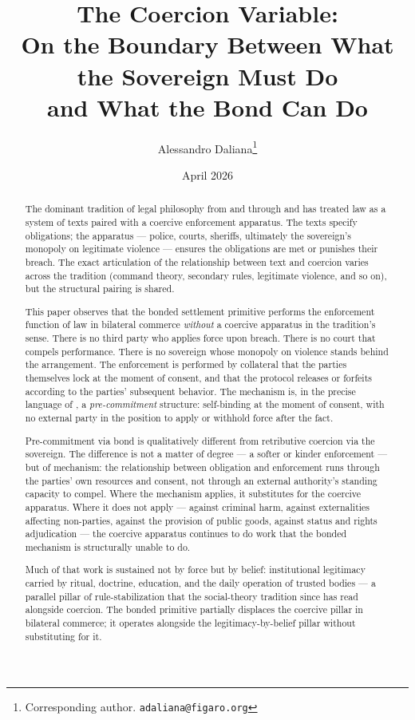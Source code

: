 \documentclass[11pt,a4paper]{article}
\title{%
  The Coercion Variable:\\
  On the Boundary Between What the Sovereign Must Do\\
  and What the Bond Can Do%
}
\author{
  Alessandro Daliana\thanks{Corresponding author. \texttt{adaliana@figaro.org}}
}
\date{April 2026}
\theoremstyle{remark}
\begin{document}
\maketitle

\begin{abstract}
The dominant tradition of legal philosophy from \citet{austin1832}
and \citet{hobbes1651} through \citet{weber1919} and
\citet{hart1961} has treated law as a system of texts paired with
a coercive enforcement apparatus. The texts specify obligations;
the apparatus --- police, courts, sheriffs, ultimately the
sovereign's monopoly on legitimate violence --- ensures the
obligations are met or punishes their breach. The exact
articulation of the relationship between text and coercion varies
across the tradition (command theory, secondary rules, legitimate
violence, and so on), but the structural pairing is shared.

This paper observes that the bonded settlement primitive
performs the enforcement function of law in bilateral commerce
\emph{without} a coercive apparatus in the tradition's sense. There is no third party who applies force
upon breach. There is no court that compels performance. There is
no sovereign whose monopoly on violence stands behind the
arrangement. The enforcement is performed by collateral that the
parties themselves lock at the moment of consent, and that the
protocol releases or forfeits according to the parties' subsequent
behavior. The mechanism is, in the precise language of
\citet{elster1979ulysses}, a \emph{pre-commitment} structure:
self-binding at the moment of consent, with no external party in
the position to apply or withhold force after the fact.

Pre-commitment via bond is qualitatively different from
retributive coercion via the sovereign. The difference is not a
matter of degree --- a softer or kinder enforcement --- but of
mechanism: the relationship between obligation and enforcement
runs through the parties' own resources and consent, not through
an external authority's standing capacity to compel. Where the
mechanism applies, it substitutes for the coercive apparatus.
Where it does not apply --- against criminal harm, against
externalities affecting non-parties, against the provision of
public goods, against status and rights adjudication --- the
coercive apparatus continues to do work that the bonded mechanism
is structurally unable to do.

Much of that work is sustained not by force but by belief:
institutional legitimacy carried by ritual, doctrine, education,
and the daily operation of trusted bodies --- a parallel pillar
of rule-stabilization that the social-theory tradition since
\citet{weber1919} has read alongside coercion. The bonded
primitive partially displaces the coercive pillar in bilateral
commerce; it operates alongside the legitimacy-by-belief pillar
without substituting for it.


\end{abstract}
\end{document}
